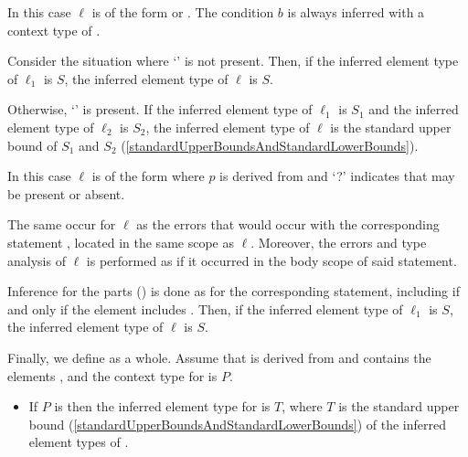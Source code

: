 \documentclass[makeidx]{article}
\begin{document}
{\LMHash{}%
In this case $\ell$ is of the form
 or
.
The condition $b$ is always inferred with a context type of .

Consider the situation where `' is not present.
Then, if the inferred element type of $\ell_1$ is $S$,
the inferred element type of $\ell$ is $S$.

Otherwise, `' is present.
If the inferred element type of $\ell_1$ is $S_1$ and
the inferred element type of $\ell_2$ is $S_2$,
the inferred element type of $\ell$ is
the standard upper bound of $S_1$ and $S_2$
(\ref{standardUpperBoundsAndStandardLowerBounds}).
\EndCase

\LMHash{}%
%
In this case $\ell$ is of the form
where $p$ is derived from  and
`\AWAIT?' indicates that \AWAIT{} may be present or absent.

The same  occur for $\ell$ as
the errors that would occur with the corresponding \FOR{} statement
,
located in the same scope as $\ell$.
Moreover, the errors and type analysis of $\ell$ is performed
as if it occurred in the body scope of said \FOR{} statement.

Inference for the parts
()
is done as for the corresponding \FOR{} statement,
including \AWAIT{} if and only if the element includes \AWAIT.
Then, if the inferred element type of $\ell_1$ is $S$,
the inferred element type of $\ell$ is $S$.

\vspace{3mm}
\EndCase

\LMHash{}%
Finally, we define
as a whole.
%
Assume that  is derived from 
and contains the elements ,
and the context type for  is $P$.

\begin{itemize}
\item
  If $P$ is \FreeContext{} then
  the inferred element type for  is $T$,
  where $T$ is the standard upper bound
  (\ref{standardUpperBoundsAndStandardLowerBounds})
  of the inferred element types of .


\end{itemize}}
\end{document}
